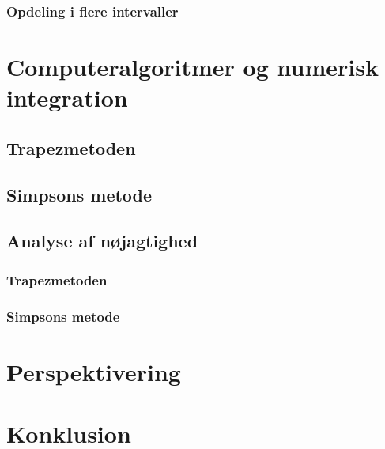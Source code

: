 \documentclass[12pt]{article}
\numberwithin{equation}{section}
\begin{document}

\subsubsection{Opdeling i flere intervaller}
\label{sec:simpsonopdeling}

\section{Computeralgoritmer og numerisk integration}
\subsection{Trapezmetoden}
\subsection{Simpsons metode}
\subsection{Analyse af nøjagtighed}
\subsubsection{Trapezmetoden}
\subsubsection{Simpsons metode}

\section{Perspektivering}
\section{Konklusion}
\end{document}
